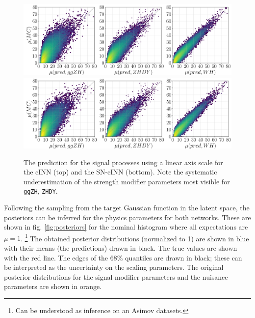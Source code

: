 \begin{figure}[h!]
	\centering
	\includegraphics[width=\linewidth]{figures/inference/p_lin}
	\includegraphics[width=\linewidth]{figures/inference/p_lin_SN}
	\caption{The prediction for the signal processes using a linear axis scale for the cINN (top) and the SN-cINN (bottom). Note the systematic underestimation of the strength modifier parameters most visible for \texttt{ggZH}, \texttt{ZHDY}.}
	\label{fig:predictions_sig_lin}
\end{figure}


Following the sampling from the target Gaussian function in the latent space, the posteriors can be inferred for the physics parameters for both networks. These are shown in fig. \ref{fig:posteriors} for the nominal histogram where all expectations are $\mu=1$. \footnote{Can be understood as inference on an Asimov datasets.} The obtained posterior distributions (normalized to 1) are shown in blue with their means (the predictions) drawn in black. The true values are shown with the red line. The edges of the 68\% quantiles are drawn in black; these can be interpreted as the uncertainty on the scaling parameters. The original posterior distributions for the signal modifier parameters and the nuisance parameters are shown in orange.

